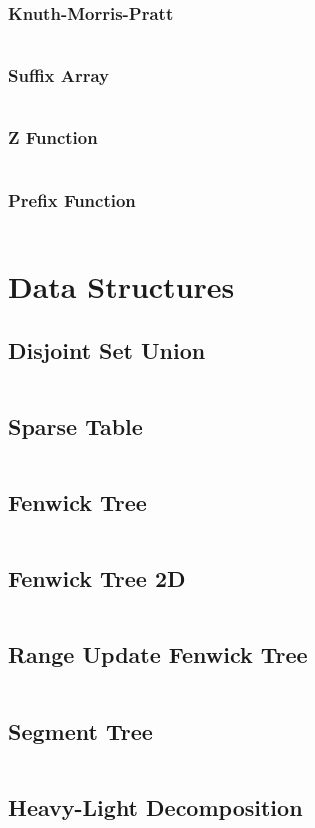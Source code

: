 \documentclass[a4paper, 10pt, twocolumn, landscape]{article}
\begin{document}
  \subsubsection{Knuth-Morris-Pratt}
  \inputminted{cpp}{strings/kmp.cpp}
  \subsubsection{Suffix Array}
  \inputminted{cpp}{strings/suffix-array.cpp}
  \subsubsection{Z Function}
  \inputminted{cpp}{strings/z.cpp}
  \subsubsection{Prefix Function}
  \inputminted{cpp}{strings/prefix.cpp}

 
  \section{Data Structures}
  \subsection{Disjoint Set Union}
  \inputminted{cpp}{data-structures/dsu.cpp}
  \subsection{Sparse Table}
  \inputminted{cpp}{data-structures/sparse.cpp}
  \subsection{Fenwick Tree}
  \inputminted{cpp}{data-structures/bit.cpp}
  \subsection{Fenwick Tree 2D}
  \inputminted{cpp}{data-structures/bit2d.cpp}
  \subsection{Range Update Fenwick Tree}
  \inputminted{cpp}{data-structures/bit-range.cpp}
  \subsection{Segment Tree}
  \inputminted{cpp}{data-structures/segtree.cpp}
  \subsection{Heavy-Light Decomposition}
  \inputminted{cpp}{data-structures/hld.cpp}
\end{document}
